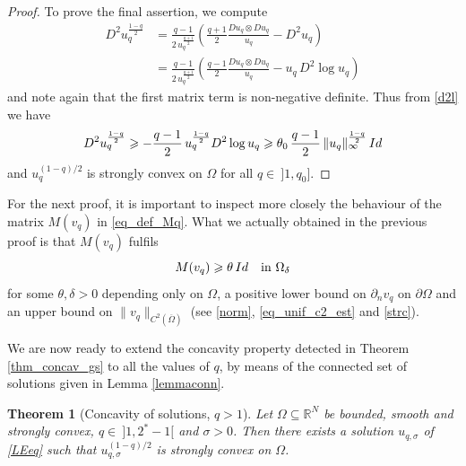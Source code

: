 \documentclass[12pt]{amsart}
\numberwithin{equation}{section}
\newtheorem{theorem}{Theorem}[section]
\theoremstyle{plain}
\theoremstyle{plain}
\theoremstyle{plain}
\theoremstyle{definition}
\newcommand{\R}{{\mathbb R}}
\newcommand{\beq}{\begin{equation}}
\newcommand{\eeq}{\end{equation}}
\renewcommand{\ge}{\geqslant}
\begin{document}
\begin{proof}
 To prove the final assertion, we compute 
 \[
 \begin{split}
 D^2 u_q^{\frac{1-q}{2}}&=\frac{q-1}{2\, u_q^{\frac{q+1}{2}}}\left(\frac{q+1}{2}\frac{D u_q\otimes D u_q}{u_q}- D^2u_q\right)\\
 &=\frac{q-1}{2\, u_q^{\frac{q+1}{2}}}\left(\frac{q-1}{2}\frac{D u_q\otimes D u_q}{u_q}-u_q\, D^2\log u_q\right)
 \end{split}
 \]
 and note again that the first matrix term is non-negative definite. 
Thus from \eqref{d2l} we have
 \[
 D^2 u_q^{\frac{1-q}{2}}\ge -\frac{q-1}{2}\, u_q^{\frac{1-q}{2}} D^2\log u_q\ge \theta_0\, \frac{q-1}{2}\, \|u_q\|_\infty^{\frac{1-q}{2}}\, {\rm Id}
 \]
and $u_q^{(1-q)/2}$ is strongly convex on $\Omega$ for all $q\in \ ]1, q_0]$. 
\end{proof}

For the next proof, it is important to inspect more closely the behaviour of the matrix $M(v_q)$ in \eqref{eq_def_Mq}. 
What we actually obtained in the previous proof is that $M(v_q)$ fulfils
\beq
\label{remMq}
M(v_q)\ge \theta\, {\rm Id}\quad \text{in $\Omega_\delta$}
\eeq
for some $\theta, \delta>0$ depending only on $\Omega$, a positive lower bound on $\partial_n v_q$ on $\partial\Omega$ and an upper bound on $\|v_q\|_{C^2(\overline\Omega)}$ (see \eqref{norm}, \eqref{eq_unif_c2_est} and \eqref{strc}).

We are now ready to extend the concavity property detected in Theorem \ref{thm_concav_gs} to all the values of $q$, by means of the connected set of solutions given in Lemma \ref{lemmaconn}.

\begin{theorem}[Concavity of solutions, $q>1$]
\label{qcsol}
Let $\Omega\subseteq \R^N$ be bounded, smooth and strongly convex, $q\in \ ]1, 2^*-1[$ and $\sigma>0$. Then there exists a solution $u_{q, \sigma}$ of \eqref{LEeq} such that $u_{q, \sigma}^{(1-q)/2}$ is strongly convex on $\Omega$.
\end{theorem}
\end{document}
